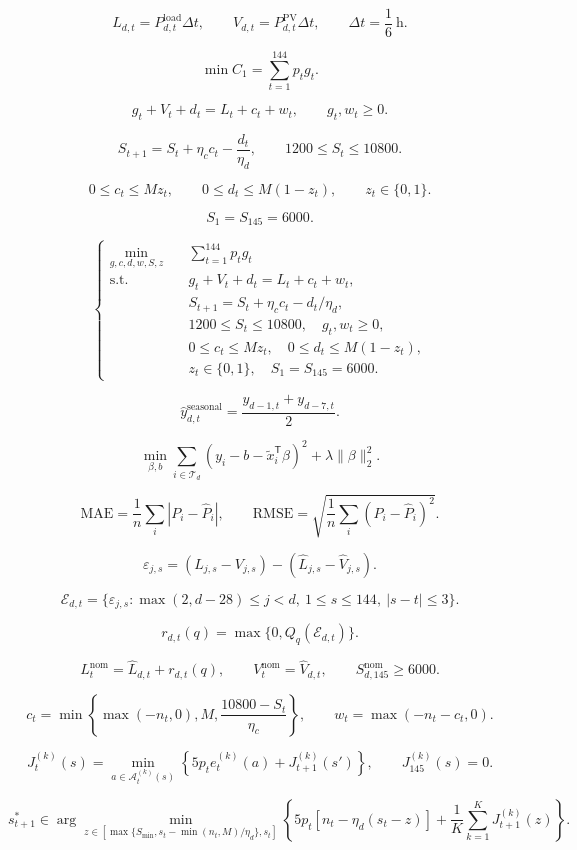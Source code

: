 \[
L_{d,t}=P^{\mathrm{load}}_{d,t}\Delta t,\qquad V_{d,t}=P^{\mathrm{PV}}_{d,t}\Delta t,\qquad \Delta t=\frac{1}{6}\ \mathrm{h}.
\]

\[
\min C_1=\sum_{t=1}^{144}p_tg_t.
\]

\[
g_t+V_t+d_t=L_t+c_t+w_t,\qquad g_t,w_t\geq0.
\]

\[
S_{t+1}=S_t+\eta_c c_t-\frac{d_t}{\eta_d},\qquad 1200\leq S_t\leq10800.
\]

\[
0\leq c_t\leq Mz_t,\qquad 0\leq d_t\leq M(1-z_t),\qquad z_t\in\{0,1\}.
\]

\[
S_1=S_{145}=6000.
\]

\[
\boxed{\left\{\begin{aligned}\min_{g,c,d,w,S,z}\quad &\sum_{t=1}^{144}p_tg_t\\\mathrm{s.t.}\quad &g_t+V_t+d_t=L_t+c_t+w_t,\\&S_{t+1}=S_t+\eta_c c_t-d_t/\eta_d,\\&1200\leq S_t\leq10800,\quad g_t,w_t\geq0,\\&0\leq c_t\leq Mz_t,\quad0\leq d_t\leq M(1-z_t),\\&z_t\in\{0,1\},\quad S_1=S_{145}=6000.\end{aligned}\right.}
\]

\[
\hat y_{d,t}^{\mathrm{seasonal}}=\frac{y_{d-1,t}+y_{d-7,t}}{2}.
\]

\[
\min_{\beta,b}\sum_{i\in\mathcal T_d}(y_i-b-\widetilde{x}_i^{\mathsf T}\beta)^2+\lambda\|\beta\|_2^2.
\]

\[
\mathrm{MAE}=\frac{1}{n}\sum_i|P_i-\widehat P_i|,\qquad\mathrm{RMSE}=\sqrt{\frac{1}{n}\sum_i(P_i-\widehat P_i)^2}.
\]

\[
\varepsilon_{j,s}=(L_{j,s}-V_{j,s})-(\hat L_{j,s}-\hat V_{j,s}).
\]

\[
\mathcal E_{d,t}=\{\varepsilon_{j,s}:\max(2,d-28)\leq j<d,\ 1\leq s\leq144,\ |s-t|\leq3\}.
\]

\[
r_{d,t}(q)=\max\{0,Q_q(\mathcal E_{d,t})\}.
\]

\[
L_t^{\mathrm{nom}}=\hat L_{d,t}+r_{d,t}(q),\qquad V_t^{\mathrm{nom}}=\hat V_{d,t},\qquad S_{d,145}^{\mathrm{nom}}\geq6000.
\]

\[
c_t=\min\left\{\max(-n_t,0),M,\frac{10800-S_t}{\eta_c}\right\},\qquad w_t=\max(-n_t-c_t,0).
\]

\[
J_t^{(k)}(s)=\min_{a\in\mathcal A_t^{(k)}(s)}\left\{5p_t e_t^{(k)}(a)+J_{t+1}^{(k)}(s')\right\},\qquad J_{145}^{(k)}(s)=0.
\]

\[
s_{t+1}^{*}\in\arg\min_{z\in[\max\{S_{\min},s_t-\min(n_t,M)/\eta_d\},s_t]}\left\{5p_t[n_t-\eta_d(s_t-z)]+\frac1K\sum_{k=1}^{K}J_{t+1}^{(k)}(z)\right\}.
\]

